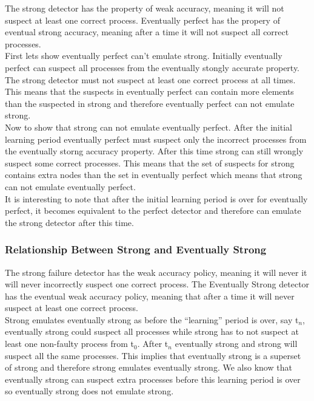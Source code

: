 \documentclass{article}
\begin{document}
The strong detector has the property of weak accuracy, meaning it will not suspect at least one correct process.  Eventually perfect has the propery of eventual strong accuracy, meaning after a time it will not suspect all correct processes.\\

First lets show eventually perfect can’t emulate strong.  Initially eventually perfect can suspect all processes from the eventually stongly accurate property.  The strong detector must not suspect at least one correct process at all times.  This means that the suspects in eventually perfect can contain more elements than the suspected in strong and therefore eventually perfect can not emulate strong.\\

Now to show that strong can not emulate eventually perfect.  After the initial learning period eventually perfect must suspect only the incorrect processes from the eventually storng accuracy property.  After this time strong can still wrongly suspect some correct processes.  This means that the set of suspects for strong contains extra nodes than the set in eventually perfect which means that strong can not emulate eventually perfect.\\

It is interesting to note that after the initial learning period is over for eventually perfect, it becomes equivalent to the perfect detector and therefore can emulate the strong detector after this time.

\subsubsection{Relationship Between Strong and Eventually Strong}

The strong failure detector has the weak accuracy policy, meaning it will never it will never incorrectly suspect one correct process.  The Eventually Strong detector has the eventual weak accuracy policy, meaning that after a time it will never suspect at least one correct process.\\

Strong emulates eventually strong as before the “learning” period is over, say t$_{n}$, eventually strong could suspect all processes while strong has to not suspect at least one non-faulty process from t$_{0}$. After t$_{n}$ eventually strong and strong will suspect all the same processes.  This implies that eventually strong is a superset of strong and therefore strong emulates eventually strong.  We also know that eventually strong can suspect extra processes before this learning period is over so eventually strong does not emulate strong.
\end{document}

